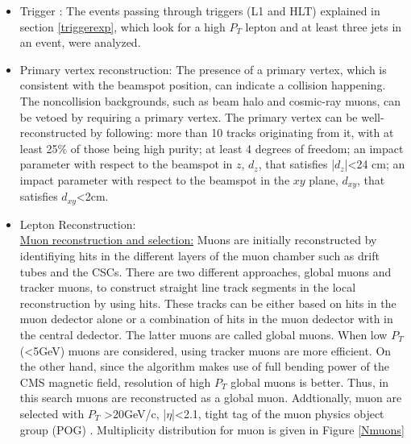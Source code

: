 \documentclass[12pt,oneandhalf,chaparabic,phys,ms,eng]{metu}
\begin{document}
\begin{itemize}

\item Trigger \cite{trigger}: The events passing through triggers (L1 and HLT) explained in section \ref{triggerexp}, which look for a high $P_T$ lepton and at least three jets in an event, were analyzed. 

\item Primary vertex reconstruction: The presence of a primary vertex, which is consistent with the beamspot position, can indicate a collision happening. The noncollision backgrounds, such as beam halo and cosmic-ray muons, can be vetoed by requiring a primary vertex. The primary vertex can be well-reconstructed by following:
more than 10 tracks originating from it, with at least 25$\%$ of those being high purity; at least 4 degrees of freedom; an impact parameter with respect to the beamspot in $z$, $d_z$, that satisfies |$d_z$|<24 cm; an impact parameter with respect to the beamspot in the $xy$ plane, $d_{xy}$, that satisfies $d_{xy}$<2cm.

\item Lepton Reconstruction: \\
\underline{Muon reconstruction and selection:} 
Muons are initially reconstructed by identifiying hits in the different layers of the muon chamber such as drift tubes and the CSCs. There are two different approaches, global muons and tracker muons, to construct straight line track segments in the local reconstruction by using hits. These tracks can be either based on hits in the muon dedector alone or a combination of hits in the muon dedector with in the central dedector. The latter muons are called global muons. When low $P_T$ (<5GeV) muons are considered, using tracker muons are more efficient. On the other hand, since the algorithm makes use of full bending power of the CMS magnetic field, resolution of high $P_T$ global muons is better. Thus, in this search muons are reconstructed as a global muon. Addtionally, muon are selected with $P_T$ >20GeV/c, |$\eta$|<2.1, tight tag of the muon physics object group (POG) \cite{R21}. Multiplicity distribution for muon is given in Figure \ref{Nmuons}


\end{itemize}
\end{document}
